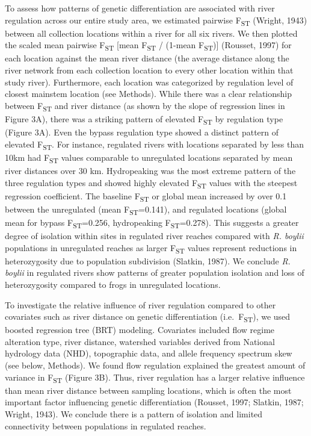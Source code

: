\documentclass[proquest,12pt,final]{ucthesis-CA2012} %
\begin{document}
\begin{ucmainmatter}
To assess how patterns of genetic differentiation are associated with
river regulation across our entire study area, we estimated pairwise
F\textsubscript{ST} (Wright, 1943) between all collection locations
within a river for all six rivers. We then plotted the scaled mean
pairwise F\textsubscript{ST} {[}mean F\textsubscript{ST} / (1-mean
F\textsubscript{ST}){]} (Rousset, 1997) for each location against the
mean river distance (the average distance along the river network from
each collection location to every other location within that study
river). Furthermore, each location was categorized by regulation level
of closest mainstem location (see Methods). While there was a clear
relationship between F\textsubscript{ST} and river distance (as shown by
the slope of regression lines in Figure 3A), there was a striking
pattern of elevated F\textsubscript{ST} by regulation type (Figure 3A).
Even the bypass regulation type showed a distinct pattern of elevated
F\textsubscript{ST}. For instance, regulated rivers with locations
separated by less than 10km had F\textsubscript{ST} values comparable to
unregulated locations separated by mean river distances over 30 km.
Hydropeaking was the most extreme pattern of the three regulation types
and showed highly elevated F\textsubscript{ST} values with the steepest
regression coefficient. The baseline F\textsubscript{ST} or global mean
increased by over 0.1 between the unregulated (mean
F\textsubscript{ST}=0.141), and regulated locations (global mean for
bypass F\textsubscript{ST}=0.256, hydropeaking
F\textsubscript{ST}=0.278). This suggests a greater degree of isolation
within sites in regulated river reaches compared with \emph{R. boylii}
populations in unregulated reaches as larger F\textsubscript{ST} values
represent reductions in heterozygosity due to population subdivision
(Slatkin, 1987). We conclude \emph{R. boylii} in regulated rivers show
patterns of greater population isolation and loss of heterozygosity
compared to frogs in unregulated locations.

To investigate the relative influence of river regulation compared to
other covariates such as river distance on genetic differentiation
(i.e.~F\textsubscript{ST}), we used boosted regression tree (BRT)
modeling. Covariates included flow regime alteration type, river
distance, watershed variables derived from National hydrology data
(NHD), topographic data, and allele frequency spectrum skew (see below,
Methods). We found flow regulation explained the greatest amount of
variance in F\textsubscript{ST} (Figure 3B). Thus, river regulation has
a larger relative influence than mean river distance between sampling
locations, which is often the most important factor influencing genetic
differentiation (Rousset, 1997; Slatkin, 1987; Wright, 1943). We
conclude there is a pattern of isolation and limited connectivity
between populations in regulated reaches.


\end{ucmainmatter}
\end{document}
